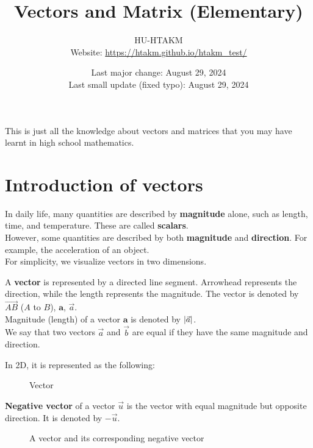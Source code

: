 \documentclass{huhtakm-template-book}
\title{Vectors and Matrix (Elementary)}
\author{
	HU-HTAKM\\
	Website: \url{https://htakm.github.io/htakm_test/}
	}
\date{
	Last major change: August 29, 2024\\
	Last small update (fixed typo): August 29, 2024
}
\begin{document}
\maketitle
This is just all the knowledge about vectors and matrices that you may have learnt in high school mathematics.
\tableofcontents
\chapter{Introduction of vectors}
In daily life, many quantities are described by \textbf{magnitude} alone, such as length, time, and temperature. These are called \textbf{scalars}.\\
However, some quantities are described by both \textbf{magnitude} and \textbf{direction}. For example, the acceleration of an object.\\
For simplicity, we visualize vectors in two dimensions.
\begin{defn}
    A \textbf{vector} is represented by a directed line segment. Arrowhead represents the direction, while the length represents the magnitude. The vector is denoted by $\overrightarrow{AB}$ ($A$ to $B$), $\mathbf{a}$, $\vec{a}$.\\
    Magnitude (length) of a vector $\mathbf{a}$ is denoted by $\left|{\vec{a}}\right|$.\\
    We say that two vectors $\vec{a}$ and $\vec{b}$ are equal if they have the same magnitude and direction.
\end{defn}
In 2D, it is represented as the following:
\begin{figure}[h]
    \centering
    \caption{Vector}
    \label{fig:vector}
\end{figure}
\begin{defn}
    \textbf{Negative vector} of a vector $\vec{u}$ is the vector with equal magnitude but opposite direction. It is denoted by $-\vec{u}$.
\end{defn}
\begin{figure}[h]
    \centering
    \caption{A vector and its corresponding negative vector}
    \label{fig:negative vector}
\end{figure}
\end{document}
